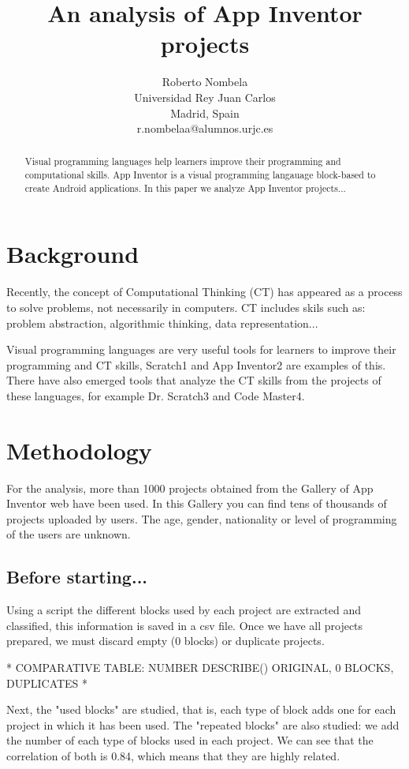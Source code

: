 \documentclass[a4paper]{article}
\title{An analysis of App Inventor projects}
\author{
Roberto Nombela \\ Universidad Rey Juan Carlos\\
                Madrid, Spain \\ r.nombelaa@alumnos.urjc.es
}
\begin{document}
\maketitle

\begin{abstract}
Visual programming languages help learners improve their programming and computational skills. App Inventor is a visual programming langauage block-based to create Android applications. In this paper we analyze App Inventor projects...
\end{abstract}


\section{Background}

Recently, the concept of Computational Thinking (CT) has appeared as a process to solve problems, not necessarily in computers. CT includes skils such as: problem abstraction, algorithmic thinking, data representation...

Visual programming languages are very useful tools for learners to improve their programming and CT skills, Scratch1 and App Inventor2 are examples of this. There have also emerged tools that analyze the CT skills from the projects of these languages, for example Dr. Scratch3 and Code Master4.

\section{Methodology}

For the analysis, more than 1000 projects obtained from the Gallery of App Inventor web have been used. In this Gallery you can find tens of thousands of projects uploaded by users. The age, gender, nationality or level of programming of the users are unknown.

\subsection{Before starting...}

Using a script the different blocks used by each project are extracted and classified, this information is saved in a csv file. Once we have all projects prepared, we must discard empty (0 blocks) or duplicate projects.

* COMPARATIVE TABLE: NUMBER DESCRIBE() ORIGINAL, 0 BLOCKS, DUPLICATES *

Next, the "used blocks" are studied, that is, each type of block adds one for each project in which it has been used. The "repeated blocks" are also studied: we add the number of each type of blocks used in each project. We can see that the correlation of both is 0.84, which means that they are highly related.
\end{document}
